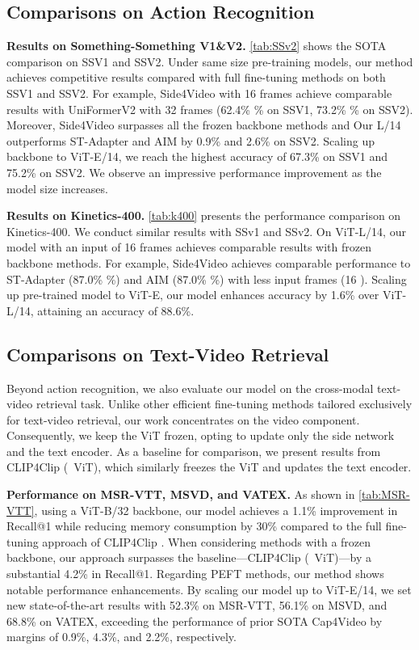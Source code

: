 \documentclass[10pt,twocolumn,letterpaper]{article}
\begin{document}
\subsection{Comparisons on Action Recognition}
\noindent\textbf{Results on Something-Something V1\&V2.} \cref{tab:SSv2} shows the SOTA comparison on SSV1 and SSV2. Under same size pre-training models, our method achieves competitive results compared with full fine-tuning methods on both SSV1 and SSV2. For example, Side4Video with 16 frames achieve comparable results with UniFormerV2 \cite{uniformerv2} with 32 frames (62.4\% \% on SSV1, 73.2\% \% on SSV2). Moreover, Side4Video surpasses all the frozen backbone methods and Our L/14 outperforms ST-Adapter and AIM by 0.9\% and 2.6\% on SSV2. Scaling up backbone to ViT-E/14, we reach the highest accuracy of 67.3\% on SSV1 and 75.2\% on SSV2. We observe an impressive performance improvement as the model size increases. 


\noindent\textbf{Results on Kinetics-400.} \cref{tab:k400} presents the performance comparison on Kinetics-400. We conduct similar results with SSv1 and SSv2. On ViT-L/14, our model with an input of 16 frames achieves comparable results with frozen backbone methods. For example, Side4Video achieves comparable performance to ST-Adapter \cite{st_adapter} (87.0\% \%) and AIM \cite{aim} (87.0\% \%) with less input frames (16 ). Scaling up pre-trained model to ViT-E, our model enhances accuracy by 1.6\% over ViT-L/14, attaining an accuracy of 88.6\%.

\subsection{Comparisons on Text-Video Retrieval}
\label{subsec: comparison on tvr}
Beyond action recognition, we also evaluate our model on the cross-modal text-video retrieval task. Unlike other efficient fine-tuning methods \cite{uniadapter, crossadapter, clip-prompting} tailored exclusively for text-video retrieval, our work concentrates on the video component. Consequently, we keep the ViT frozen, opting to update only the side network and the text encoder. As a baseline for comparison, we present results from CLIP4Clip (\faLock~ViT), which similarly freezes the ViT and updates the text encoder.

\noindent\textbf{Performance on MSR-VTT, MSVD, and VATEX.} As shown in \cref{tab:MSR-VTT}, using a ViT-B/32 backbone, our model achieves a 1.1\% improvement in Recall@1 while reducing memory consumption by 30\% compared to the full fine-tuning approach of CLIP4Clip \cite{clip4clip}. When considering methods with a frozen backbone, our approach surpasses the baseline—CLIP4Clip (\faLock~ViT)—by a substantial 4.2\% in Recall@1. Regarding PEFT methods, our method shows notable performance enhancements. By scaling our model up to ViT-E/14, we set new state-of-the-art results with 52.3\% on MSR-VTT, 56.1\% on MSVD, and 68.8\% on VATEX, exceeding the performance of prior SOTA Cap4Video \cite{wu2023cap4video} by margins of 0.9\%, 4.3\%, and 2.2\%, respectively.
\end{document}
